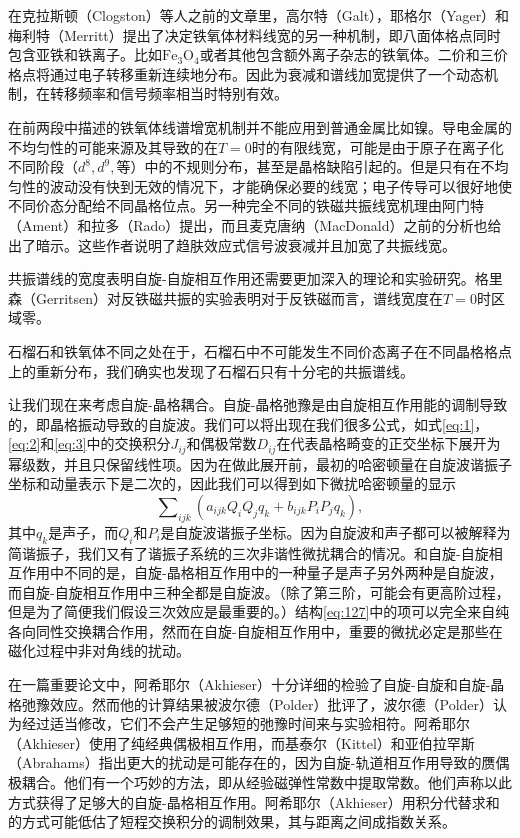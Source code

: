 \documentclass{article}
\begin{document}
在克拉斯顿（Clogston）等人之前的文章里，高尔特（Galt），耶格尔（Yager）和梅利特（Merritt）提出了决定铁氧体材料线宽的另一种机制，即八面体格点同时包含亚铁和铁离子。比如$\mathrm{Fe_3O_4}$或者其他包含额外离子杂志的铁氧体。二价和三价格点将通过电子转移重新连续地分布。因此为衰减和谱线加宽提供了一个动态机制，在转移频率和信号频率相当时特别有效。

在前两段中描述的铁氧体线谱增宽机制并不能应用到普通金属比如镍。导电金属的不均匀性的可能来源及其导致的在$T=0$时的有限线宽，可能是由于原子在离子化不同阶段（$d^8,d^9,等$）中的不规则分布，甚至是晶格缺陷引起的。但是只有在不均匀性的波动没有快到无效的情况下，才能确保必要的线宽；电子传导可以很好地使不同价态分配给不同晶格位点。另一种完全不同的铁磁共振线宽机理由阿门特（Ament）和拉多（Rado）提出，而且麦克唐纳（MacDonald）之前的分析也给出了暗示。这些作者说明了趋肤效应式信号波衰减并且加宽了共振线宽。

共振谱线的宽度表明自旋-自旋相互作用还需要更加深入的理论和实验研究。格里森（Gerritsen）对反铁磁共振的实验表明对于反铁磁而言，谱线宽度在$T=0$时区域零。

石榴石和铁氧体不同之处在于，石榴石中不可能发生不同价态离子在不同晶格格点上的重新分布，我们确实也发现了石榴石只有十分宅的共振谱线。

让我们现在来考虑自旋-晶格耦合。自旋-晶格弛豫是由自旋相互作用能的调制导致的，即晶格振动导致的自旋波。我们可以将出现在我们很多公式，如式\eqref{eq:1}，\eqref{eq:2}和\eqref{eq:3}中的交换积分$J_{ij}$和偶极常数$D_{ij}$在代表晶格畸变的正交坐标下展开为幂级数，并且只保留线性项。因为在做此展开前，最初的哈密顿量在自旋波谐振子坐标和动量表示下是二次的，因此我们可以得到如下微扰哈密顿量的显示
\begin{equation} \label{eq:127}
\sum\nolimits_{\mathit{ijk}}(a_\mathit{ijk}Q_iQ_jq_k+b_\mathit{ijk}P_iP_jq_k),
\end{equation}
其中$q_k$是声子，而$Q_i$和$P_i$是自旋波谐振子坐标。因为自旋波和声子都可以被解释为简谐振子，我们又有了谐振子系统的三次非谐性微扰耦合的情况。和自旋-自旋相互作用中不同的是，自旋-晶格相互作用中的一种量子是声子另外两种是自旋波，而自旋-自旋相互作用中三种全都是自旋波。（除了第三阶，可能会有更高阶过程，但是为了简便我们假设三次效应是最重要的。）结构\eqref{eq:127}中的项可以完全来自纯各向同性交换耦合作用，然而在自旋-自旋相互作用中，重要的微扰必定是那些在磁化过程中非对角线的扰动。

在一篇重要论文中，阿希耶尔（Akhieser）十分详细的检验了自旋-自旋和自旋-晶格弛豫效应。然而他的计算结果被波尔德（Polder）批评了，波尔德（Polder）认为经过适当修改，它们不会产生足够短的弛豫时间来与实验相符。阿希耶尔（Akhieser）使用了纯经典偶极相互作用，而基泰尔（Kittel）和亚伯拉罕斯（Abrahams）指出更大的扰动是可能存在的，因为自旋-轨道相互作用导致的赝偶极耦合。他们有一个巧妙的方法，即从经验磁弹性常数中提取常数。他们声称以此方式获得了足够大的自旋-晶格相互作用。阿希耶尔（Akhieser）用积分代替求和的方式可能低估了短程交换积分的调制效果，其与距离之间成指数关系。
\end{document}
